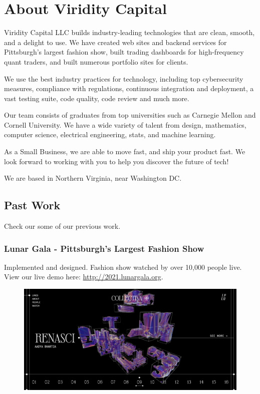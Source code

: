 
\section{About Viridity Capital}

Viridity Capital LLC builds industry-leading technologies that are clean,
smooth, and a delight to use. We have created web sites and backend services
for Pittsburgh's largest fashion show, built trading dashboards for
high-frequency quant traders, and built numerous portfolio sites for clients.

We use the best industry practices for technology, including top cybersecurity
measures, compliance with regulations, continuous integration and deployment, a
vast testing suite, code quality, code review and much more.

Our team consists of graduates from top universities such as Carnegie Mellon
and Cornell University. We have a wide variety of talent from design,
mathematics, computer science, electrical engineering, stats, and machine
learning.

As a Small Business, we are able to move fast, and ship your product fast. We
look forward to working with you to help you discover the future of tech!

We are based in Northern Virginia, near Washington DC.

\subsection{Past Work}
\label{past_work}

Check our some of our previous work.

\subsubsection{Lunar Gala - Pittsburgh's Largest Fashion Show}

Implemented and designed. Fashion show watched by over 10,000 people live. 
View our live demo here: \href{http://2021.lunargala.org/}{http://2021.lunargala.org}. \vspace{12pt}

\begin{figure}[H]
  \centering
  \includegraphics[width=\textwidth]{lunargala.jpg}
\end{figure}

